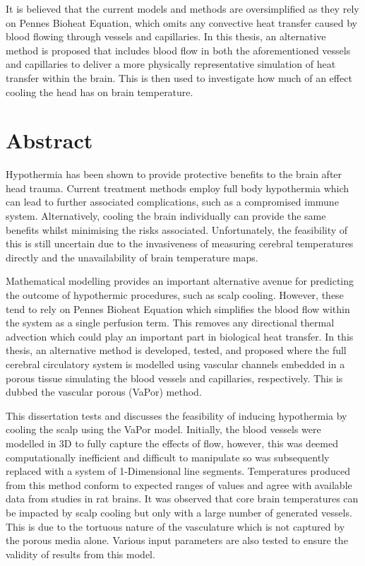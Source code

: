 \documentclass[11pt,english,a4paper,twoside,openright]{report}
\begin{document}
{{	It is believed that the current models and methods are oversimplified as they rely on Pennes Bioheat Equation, which omits any convective heat transfer caused by blood flowing through vessels and capillaries. In this thesis, an alternative method is proposed that includes blood flow in both the aforementioned vessels and capillaries to deliver a more physically representative simulation of heat transfer within the brain. This is then used to investigate how much of an effect cooling the head has on brain temperature.
	
	\newpage
	\thispagestyle{empty}
	
	\chapter*{{\Huge A}bstract}
	
	Hypothermia has been shown to provide protective benefits to the brain after head trauma. Current treatment methods employ full body hypothermia which can lead to further associated complications, such as a compromised immune system. Alternatively, cooling the brain individually can provide the same benefits whilst minimising the risks associated. Unfortunately, the feasibility of this is still uncertain due to the invasiveness of measuring cerebral temperatures directly and the unavailability of brain temperature maps.
	
	Mathematical modelling provides an important alternative avenue for predicting the outcome of hypothermic procedures, such as scalp cooling. However, these tend to rely on Pennes Bioheat Equation which simplifies the blood flow within the system as a single perfusion term. This removes any directional thermal advection which could play an important part in biological heat transfer. In this thesis, an alternative method is developed, tested, and proposed where the full cerebral circulatory system is modelled using vascular channels embedded in a porous tissue simulating the blood vessels and capillaries, respectively. This is dubbed the vascular porous (VaPor) method.
	
	This dissertation tests and discusses the feasibility of inducing hypothermia by cooling the scalp using the VaPor model. Initially, the blood vessels were modelled in 3D to fully capture the effects of flow, however, this was deemed computationally inefficient and difficult to manipulate so was subsequently replaced with a system of 1-Dimensional line segments. Temperatures produced from this method conform to expected ranges of values and agree with available data from studies in rat brains. It was observed that core brain temperatures can be impacted by scalp cooling but only with a large number of generated vessels. This is due to the tortuous nature of the vasculature which is not captured by the porous media alone. Various input parameters are also tested to ensure the validity of results from this model.
	
}}
\end{document}
